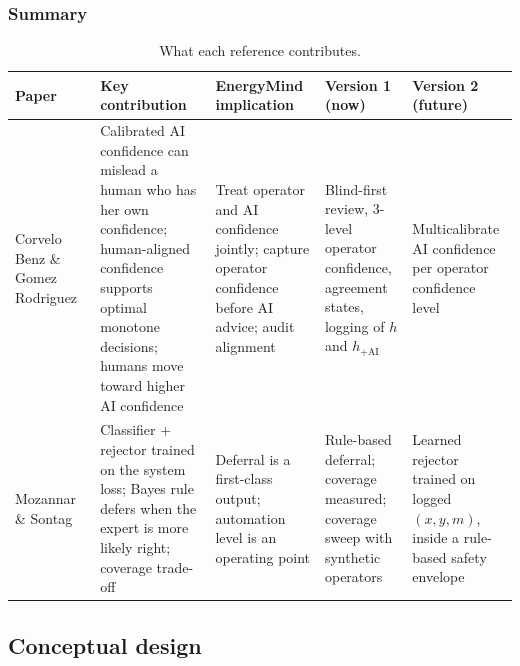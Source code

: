\documentclass[11pt,a4paper]{article}
\renewcommand{\_}{\textunderscore\allowbreak}
\begin{document}
\subsubsection{Summary}
\begin{table}[H]
\centering\small
\begin{tabularx}{\textwidth}{@{}>{\raggedright\arraybackslash}p{2.1cm}LLLL@{}}
\toprule
\textbf{Paper} & \textbf{Key contribution} & \textbf{EnergyMind implication} & \textbf{Version 1 (now)} & \textbf{Version 2 (future)} \\
\midrule
Corvelo Benz \& Gomez Rodriguez~\cite{benz} & Calibrated AI confidence can mislead a human who has her own confidence; human-aligned confidence supports optimal monotone decisions; humans move toward higher AI confidence & Treat operator and AI confidence jointly; capture operator confidence before AI advice; audit alignment & Blind-first review, 3-level operator confidence, agreement states, logging of $h$ and $h_{+\mathrm{AI}}$ & Multicalibrate AI confidence per operator confidence level \\
\addlinespace
Mozannar \& Sontag~\cite{mozannar} & Classifier + rejector trained on the system loss; Bayes rule defers when the expert is more likely right; coverage trade-off & Deferral is a first-class output; automation level is an operating point & Rule-based deferral; coverage measured; coverage sweep with synthetic operators & Learned rejector trained on logged $(x,y,m)$, inside a rule-based safety envelope \\
\bottomrule
\end{tabularx}
\caption{What each reference contributes.}
\end{table}

\subsection{Conceptual design}
\end{document}
